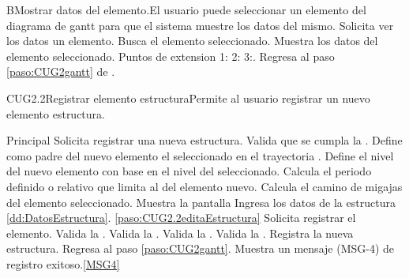 	\begin{UCtrayectoriaA}{B}{Mostrar datos del elemento.}{El usuario puede seleccionar un elemento del diagrama de gantt para que el sistema muestre los datos del mismo.}
			\UCpaso[\UCactor] Solicita ver los datos un elemento.
			\UCpaso Busca el elemento seleccionado.
			\UCpaso Muestra los datos del elemento seleccionado. Puntos de extension 1: 2: 3:.
			\UCpaso Regresa al paso \ref{paso:CUG2gantt} de . 
	\end{UCtrayectoriaA}


	  
	\begin{UseCase}{CUG2.2}{Registrar elemento estructura}{Permite al usuario registrar un nuevo elemento estructura.}
	\end{UseCase}

	\begin{UCtrayectoria}{Principal}
		\UCpaso[\UCactor] Solicita registrar una nueva estructura.
		\UCpaso Valida que se cumpla la   .
		\UCpaso Define como padre del nuevo elemento el seleccionado en el  trayectoria . 
		\UCpaso Define el nivel del nuevo elemento con base en el nivel del seleccionado.
		\UCpaso Calcula el periodo definido o relativo que limita al del elemento nuevo.
		\UCpaso Calcula el camino de migajas del elemento seleccionado.
		\UCpaso Muestra la pantalla 
		\UCpaso [\UCactor] Ingresa los datos de la estructura \ref{dd:DatosEstructura}. \ref{paso:CUG2.2editaEstructura}
		\UCpaso [\UCactor] Solicita registrar el elemento.  
		\UCpaso Valida la   .
		\UCpaso Valida la   .
		\UCpaso Valida la  .
		\UCpaso Valida la  .
		\UCpaso Registra la nueva estructura.
		\UCpaso Regresa al paso \ref{paso:CUG2gantt}.
		\UCpaso Muestra un mensaje (MSG-4) de registro exitoso.\ref{MSG4}
	\end{UCtrayectoria}

